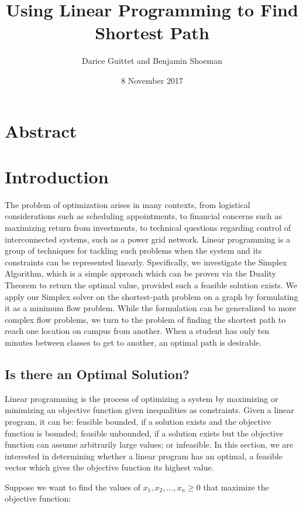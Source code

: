 \documentclass[12pt]{article}
\title{Using Linear Programming to Find Shortest Path}
\author{Darice Guittet and Benjamin Shoeman}
\date{8 November 2017}
\begin{document}
\maketitle

\section{Abstract}



\section{Introduction}
The problem of optimization arises in many contexts, from logistical considerations such as scheduling appointments, to financial concerns such as maximizing return from investments, to technical questions regarding control of interconnected systems, such as a power grid network. Linear programming is a group of techniques for tackling such problems when the system and its constraints can be represented linearly. Specifically, we investigate the Simplex Algorithm, which is a simple approach which can be proven via the Duality Theorem to return the optimal value, provided such a feasible solution exists. We apply our Simplex solver on the shortest-path problem on a graph by formulating it as a minimum flow problem. While the formulation can be generalized to more complex flow problems, we turn to the problem of finding the shortest path to reach one location on campus from another. When a student has only ten minutes between classes to get to another, an optimal path is desirable. 

\subsection{Is there an Optimal Solution?}
Linear programming is the process of optimizing a system by maximizing or minimizing an objective function given inequalities as constraints. Given a linear program, it can be: feasible bounded, if a solution exists and the objective function is bounded; feasible unbounded, if a solution exists but the objective function can assume arbitrarily large values; or infeasible. In this section, we are interested in determining whether a linear program has an optimal, a feasible vector which gives the objective function its highest value. 

Suppose we want to find the values of $x_1, x_2, \ldots, x_n \geq 0$ that maximize the objective function:
\end{document}

